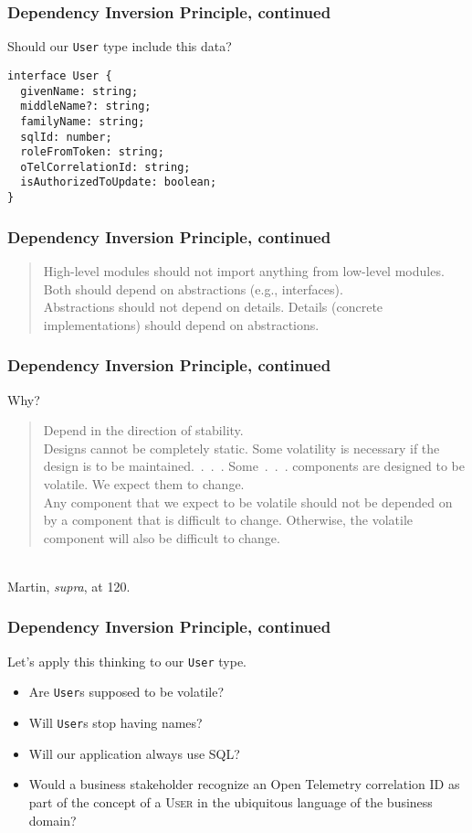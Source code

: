 \documentclass[aspectratio=169]{beamer}
\begin{document}
\begin{frame}[fragile]
  \frametitle{Dependency Inversion Principle, continued}
  Should our \texttt{User} type include this data?
  \vspace{1em}
  \begin{verbatim}
interface User {
  givenName: string;
  middleName?: string;
  familyName: string;
  sqlId: number;
  roleFromToken: string;
  oTelCorrelationId: string;
  isAuthorizedToUpdate: boolean;
}
  \end{verbatim}
\end{frame}


\begin{frame}
  \frametitle{Dependency Inversion Principle, continued}
  \begin{quote}
    High-level modules should not import anything from low-level modules. Both
    should depend on abstractions (e.g., interfaces).
    \vspace{1em}
    \\
    Abstractions should not depend on details. Details (concrete
    implementations) should depend on abstractions.
  \end{quote}
\end{frame}

\begin{frame}
  \frametitle{Dependency Inversion Principle, continued}
  Why?
  \vspace{1em}
  \\
  \begin{quote}
    Depend in the direction of stability. \\

    Designs cannot be completely static. Some volatility is necessary if the
    design is to be maintained.~.~.~. Some~.~.~. components are designed to be
    volatile.  We expect them to change. \\

    Any component that we expect to be volatile should not be depended on by a
    component that is difficult to change.  Otherwise, the volatile component
    will also be difficult to change.
  \end{quote}\\
  \vspace{1em}
  Martin, \textit{supra}, at 120.
\end{frame}

\begin{frame}
  \frametitle{Dependency Inversion Principle, continued}
  Let's apply this thinking to our \texttt{User} type.

  \begin{itemize}
    \item Are \texttt{User}s supposed to be volatile?
    \item Will \texttt{User}s stop having names?
    \item Will our application always use SQL?
    \item Would a business stakeholder recognize an Open Telemetry correlation
          ID as part of the concept of a \textsc{User} in the ubiquitous
          language of the business domain?
  \end{itemize}
\end{frame}
\end{document}
